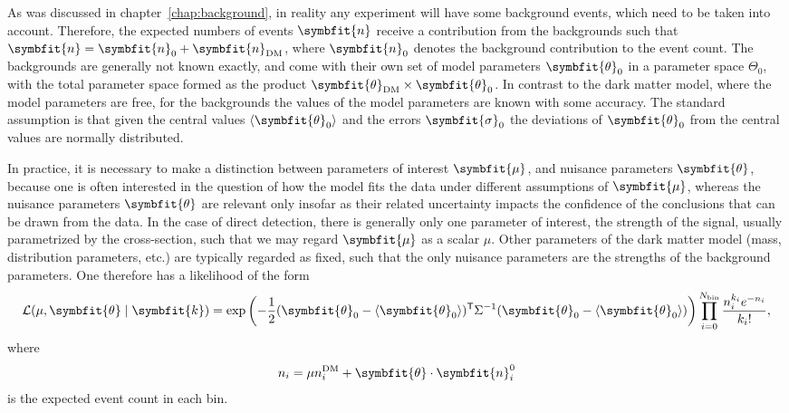 \documentclass[b5paper, 10pt, twoside]{book}
\renewcommand{\vec}[1]{\symbfit{#1}}
\newcommand{\tmean}[1]{\langle#1\rangle}
\newcommand{\transp}{\mathsf{T}}
\begin{document}
As was discussed in chapter~\ref{chap:background}, in reality any experiment will have some background events, which need to be taken into account. Therefore, the expected numbers of events $\vec{n}$ receive a contribution from the backgrounds such that $\vec{n}=\vec{n}_\text{0}+\vec{n}_\text{DM}$, where $\vec{n}_\text{0}$ denotes the background contribution to the event count. The backgrounds are generally not known exactly, and come with their own set of model parameters $\vec{\theta}_0$ in a parameter space $\Theta_0$, with the total parameter space formed as the product $\vec{\theta}_\text{DM}\times\vec{\theta}_0$. In contrast to the dark matter model, where the model parameters are free, for the backgrounds the values of the model parameters are known with some accuracy. The standard assumption is that given the central values $\tmean{\vec{\theta}_0}$ and the errors $\vec{\sigma}_0$ the deviations of $\vec{\theta}_0$ from the central values are normally distributed.

In practice, it is necessary to make a distinction between parameters of interest $\vec{\mu}$, and nuisance parameters $\vec{\theta}$, because one is often interested in the question of how the model fits the data under different assumptions of $\vec{\mu}$, whereas the nuisance parameters $\vec{\theta}$ are relevant only insofar as their related uncertainty impacts the confidence of the conclusions that can be drawn from the data. In the case of direct detection, there is generally only one parameter of interest, the strength of the signal, usually parametrized by the cross-section, such that we may regard $\vec{\mu}$ as a scalar $\mu$. Other parameters of the dark matter model (mass, distribution parameters, etc.) are typically regarded as fixed, such that the only nuisance parameters are the strengths of the background parameters. One therefore has a likelihood of the form
\begin{equation}
    \mathcal{L}(\mu,\vec{\theta}\mid\vec{k})=\exp\left(-\frac{1}{2}(\vec{\theta}_0-\tmean{\vec{\theta}_0})^\transp\Sigma^{-1}(\vec{\theta}_0-\tmean{\vec{\theta}_0})\right)\prod_{i=0}^{N_\text{bin}}\frac{n_i^{k_i}e^{-n_i}}{{k_i}!},
    \label{eq:likelihood}
\end{equation}
where
\begin{equation}
    n_i=\mu n_i^\text{DM}+\vec{\theta}\cdot\vec{n}_i^0
\end{equation}
is the expected event count in each bin.
\end{document}
